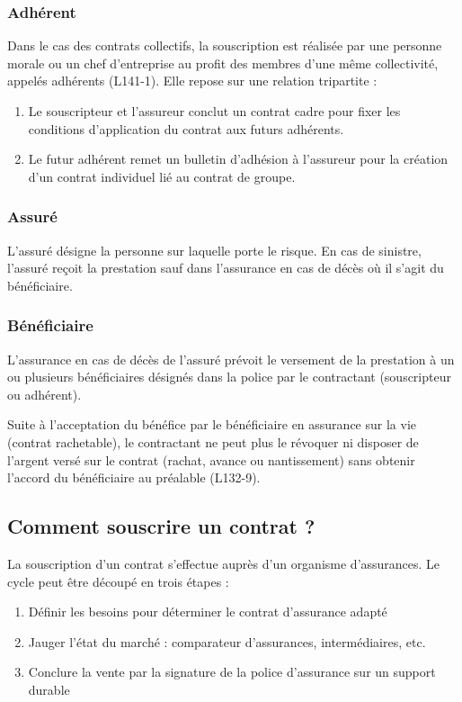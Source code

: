 \documentclass{article}
\begin{document}
\subsubsection{Adhérent}
Dans le cas des contrats collectifs, la souscription est réalisée par une personne morale ou un chef d'entreprise au profit des membres d'une même collectivité, appelés adhérents (L141-1). Elle repose sur une relation tripartite :
\begin{enumerate}
    \item Le souscripteur et l'assureur conclut un contrat cadre pour fixer les conditions d'application du contrat aux futurs adhérents.
    \item Le futur adhérent remet un bulletin d'adhésion à l'assureur pour la création d'un contrat individuel lié au contrat de groupe.
\end{enumerate}

\subsubsection{Assuré}
L'assuré désigne la personne sur laquelle porte le risque. En cas de sinistre, l'assuré reçoit la prestation sauf dans l'assurance en cas de décès où il s'agit du bénéficiaire.

\subsubsection{Bénéficiaire}
L'assurance en cas de décès de l'assuré prévoit le versement de la prestation à un ou plusieurs bénéficiaires désignés dans la police par le contractant (souscripteur ou adhérent).

Suite à l'acceptation du bénéfice par le bénéficiaire en assurance sur la vie (contrat rachetable), le contractant ne peut plus le révoquer ni disposer de l'argent versé sur le contrat (rachat, avance ou nantissement) sans obtenir l'accord du bénéficiaire au préalable (L132-9).

\subsection{Comment souscrire un contrat ?}
La souscription d'un contrat s'effectue auprès d'un organisme d'assurances. Le cycle peut être découpé en trois étapes :
\begin{enumerate}
    \item Définir les besoins pour déterminer le contrat d'assurance adapté
    \item Jauger l'état du marché : comparateur d'assurances, intermédiaires, etc.
    \item Conclure la vente par la signature de la police d'assurance sur un support durable
\end{enumerate}
\end{document}
